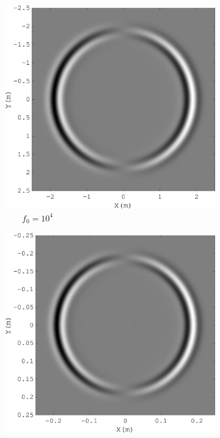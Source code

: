 \documentclass[3p,times,table]{article}
\begin{document}
\begin{figure}[!htbp]
\begin{subfigure}{0.3\linewidth}
\includegraphics[draft=false,width=1\textwidth]{Figures/frec_big_10_4}
\caption{$\quad\quad f_0=10^{4} $}
\end{subfigure}
\hfill
\begin{subfigure}{0.3\linewidth}
\includegraphics[draft=false,width=1\textwidth]{Figures/frec_big_10_5}

\end{subfigure}
\end{figure}
\end{document}
